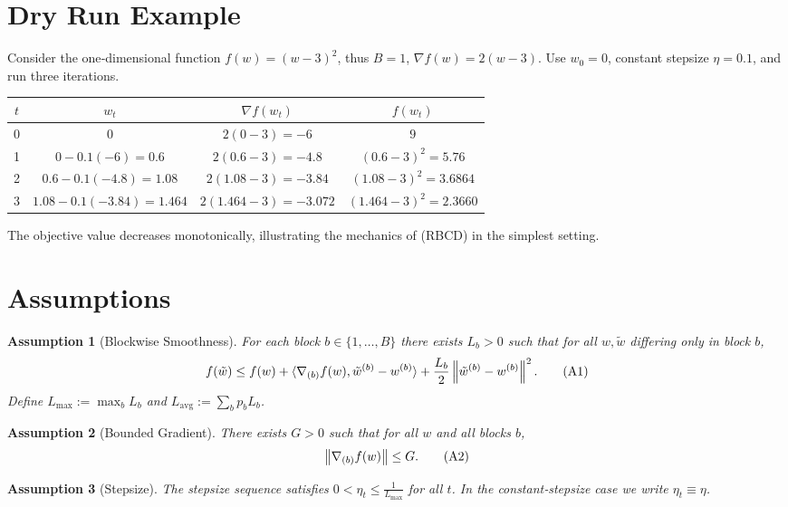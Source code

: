 \documentclass{article}
\newtheorem{assumption}{Assumption}
\newcommand{\norm}[1]{\left\|#1\right\|}
\newcommand{\grad}[1]{\nabla #1}
\begin{document}
\section*{Dry Run Example}
Consider the one‑dimensional function $f(w)=(w-3)^{2}$, thus $B=1$,
$\grad f(w)=2(w-3)$.  Use $w_{0}=0$, constant stepsize $\eta=0.1$, and run three
iterations.

\begin{center}
\begin{tabular}{c|c|c|c}
$t$ & $w_{t}$ & $\grad f(w_{t})$ & $f(w_{t})$\\\hline
0 & $0$ & $2(0-3)=-6$ & $9$\\
1 & $0-0.1(-6)=0.6$ & $2(0.6-3)=-4.8$ & $(0.6-3)^{2}=5.76$\\
2 & $0.6-0.1(-4.8)=1.08$ & $2(1.08-3)=-3.84$ & $(1.08-3)^{2}=3.6864$\\
3 & $1.08-0.1(-3.84)=1.464$ & $2(1.464-3)=-3.072$ & $(1.464-3)^{2}=2.3660$
\end{tabular}
\end{center}
The objective value decreases monotonically, illustrating the mechanics of
(RBCD) in the simplest setting.

\section*{Assumptions}
\begin{assumption}[Blockwise Smoothness]\label{ass:smooth}
For each block $b\in\{1,\dots ,B\}$ there exists $L_{b}>0$ such that for all
$w,\tilde w$ differing only in block $b$,
\[
f(\tilde w)\le f(w)+\langle \grad_{(b)}f(w),\tilde w^{(b)}-w^{(b)}\rangle
+\frac{L_{b}}{2}\norm{\tilde w^{(b)}-w^{(b)}}^{2}.
\tag{A1}
\]
Define $L_{\max}:=\max_{b}L_{b}$ and $L_{\mathrm{avg}}:=\sum_{b}p_{b}L_{b}$.
\end{assumption}

\begin{assumption}[Bounded Gradient]\label{ass:bound}
There exists $G>0$ such that for all $w$ and all blocks $b$,
\[
\norm{\grad_{(b)}f(w)}\le G . \tag{A2}
\]
\end{assumption}

\begin{assumption}[Stepsize]\label{ass:stepsize}
The stepsize sequence satisfies $0<\eta_{t}\le \frac{1}{L_{\max}}$
for all $t$.  In the constant‑stepsize case we write $\eta_{t}\equiv\eta$.
\end{assumption}
\end{document}
